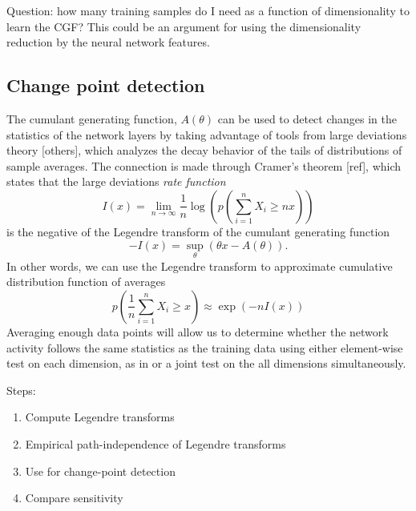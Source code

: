 \documentclass[10pt]{article}      %
\begin{document}
Question: how many training samples do I need as a function of dimensionality to learn the CGF? This could be an argument for using the dimensionality reduction by the neural network features.


\subsection{Change point detection}
The cumulant generating function, $A(\theta)$ can be used to detect changes in the statistics of the network layers by taking advantage of tools from large deviations theory \cite{touchette_basic_2012} [others], which analyzes the decay behavior of the tails of distributions of sample averages.
The connection is made through Cramer's theorem [ref], which states that the large deviations \textit{rate function}
\begin{equation}
  I(x) = \lim_{n \to \infty} \frac{1}{n} \log \left( p \left( \sum_{i=1}^n X_i \ge n x \right) \right)
\end{equation}
is the negative of the Legendre transform of the cumulant generating function
\begin{equation}
  -I(x) = \sup_{\theta}( \theta x - A(\theta) ).
\end{equation}
In other words, we can use the Legendre transform to approximate cumulative distribution function of averages
\begin{equation}
  p \left( \frac{1}{n} \sum_{i=1}^n X_i \ge x \right) \approx \exp(-n I(x))
\end{equation}
Averaging enough data points will allow us to determine whether the network activity follows the same statistics as the training data using either element-wise test on each dimension, as in \cite{rabanser_failing_2019} or a joint test on the all dimensions simultaneously.


Steps:
\begin{enumerate}
  \item Compute Legendre transforms
  \item Empirical path-independence of Legendre transforms
  \item Use for change-point detection
  \item Compare sensitivity
\end{enumerate}
\end{document}
